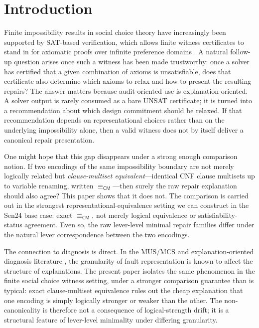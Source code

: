 \section{Introduction}

Finite impossibility results in social choice theory have increasingly been supported by SAT-based verification, which allows finite witness certificates to stand in for axiomatic proofs over infinite preference domains \citep{tanglin2009computer,geist2011automated}.
A natural follow-up question arises once such a witness has been made trustworthy: once a solver has certified that a given combination of axioms is unsatisfiable, does that certificate also determine which axioms to relax and how to present the resulting repairs?
The answer matters because audit-oriented use is explanation-oriented.
A solver output is rarely consumed as a bare UNSAT certificate; it is turned into a recommendation about which design commitment should be relaxed.
If that recommendation depends on representational choices rather than on the underlying impossibility alone, then a valid witness does not by itself deliver a canonical repair presentation.

One might hope that this gap disappears under a strong enough comparison notion.
If two encodings of the same impossibility boundary are not merely logically related but \emph{clause-multiset equivalent}---identical CNF clause multisets up to variable renaming, written $\equiv_{\mathsf{CM}}$---then surely the raw repair explanation should also agree?
This paper shows that it does not.
The comparison is carried out in the strongest representational-equivalence setting we can construct in the Sen24 base case: exact $\equiv_{\mathsf{CM}}$, not merely logical equivalence or satisfiability-status agreement.
Even so, the raw lever-level minimal repair families differ under the natural lever correspondence between the two encodings.

The connection to diagnosis is direct.
In the MUS/MCS and explanation-oriented diagnosis literature \citep{dekleer1986atms}, the granularity of fault representation is known to affect the structure of explanations.
The present paper isolates the same phenomenon in the finite social choice witness setting, under a stronger comparison guarantee than is typical: exact clause-multiset equivalence rules out the cheap explanation that one encoding is simply logically stronger or weaker than the other.
The non-canonicality is therefore not a consequence of logical-strength drift; it is a structural feature of lever-level minimality under differing granularity.


